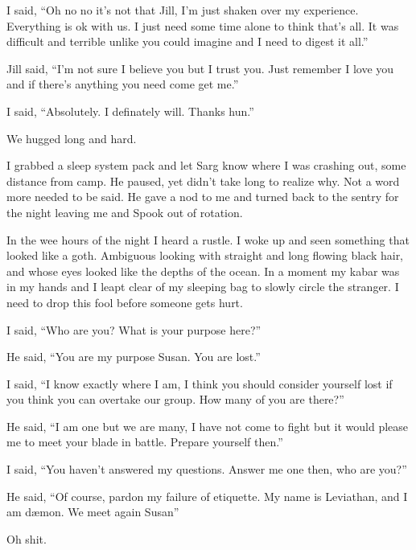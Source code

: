 I said, ``Oh no no it's not that Jill, I'm just shaken over my experience. Everything is ok with us. I just need some time alone to think that's all. It was difficult and terrible unlike you could imagine and I need to digest it all.''

Jill said, ``I'm not sure I believe you but I trust you. Just remember I love you and if there's anything you need come get me.''

I said, ``Absolutely. I definately will. Thanks hun.''

We hugged long and hard.

I grabbed a sleep system pack and let Sarg know where I was crashing out, some distance from camp. He paused, yet didn't take long to realize why. Not a word more needed to be said. He gave a nod to me and turned back to the sentry for the night leaving me and Spook out of rotation.

In the wee hours of the night I heard a rustle. I woke up and seen something that looked like a goth. Ambiguous looking with straight and long flowing black hair, and whose eyes looked like the depths of the ocean. In a moment my kabar was in my hands and I leapt clear of my sleeping bag to slowly circle the stranger. I need to drop this fool before someone gets hurt.

I said, ``Who are you? What is your purpose here?''

He said, ``You are my purpose Susan. You are lost.''

I said, ``I know exactly where I am, I think you should consider yourself lost if you think you can overtake our group. How many of you are there?''

He said, ``I am one but we are many, I have not come to fight but it would please me to meet your blade in battle. Prepare yourself then.''

I said, ``You haven't answered my questions. Answer me one then, who are you?''

He said, ``Of course, pardon my failure of etiquette. My name is Leviathan, and I am d\ae mon. We meet again Susan''

Oh shit.
